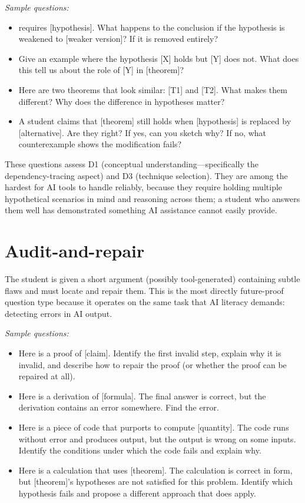 \documentclass[11pt]{book}
\begin{document}
\textit{Sample questions:}

\begin{itemize}\setlength{\itemsep}{2pt}
\item [Theorem] requires [hypothesis]. What happens to the conclusion if the hypothesis is weakened to [weaker version]? If it is removed entirely?
\item Give an example where the hypothesis [X] holds but [Y] does not. What does this tell us about the role of [Y] in [theorem]?
\item Here are two theorems that look similar: [T1] and [T2]. What makes them different? Why does the difference in hypotheses matter?
\item A student claims that [theorem] still holds when [hypothesis] is replaced by [alternative]. Are they right? If yes, can you sketch why? If no, what counterexample shows the modification fails?
\end{itemize}

These questions assess D1 (conceptual understanding---specifically the dependency-tracing aspect) and D3 (technique selection). They are among the hardest for AI tools to handle reliably, because they require holding multiple hypothetical scenarios in mind and reasoning across them; a student who answers them well has demonstrated something AI assistance cannot easily provide.

\section{Audit-and-repair}

The student is given a short argument (possibly tool-generated) containing subtle flaws and must locate and repair them. This is the most directly future-proof question type because it operates on the same task that AI literacy demands: detecting errors in AI output.

\textit{Sample questions:}

\begin{itemize}\setlength{\itemsep}{2pt}
\item Here is a proof of [claim]. Identify the first invalid step, explain why it is invalid, and describe how to repair the proof (or whether the proof can be repaired at all).
\item Here is a derivation of [formula]. The final answer is correct, but the derivation contains an error somewhere. Find the error.
\item Here is a piece of code that purports to compute [quantity]. The code runs without error and produces output, but the output is wrong on some inputs. Identify the conditions under which the code fails and explain why.
\item Here is a calculation that uses [theorem]. The calculation is correct in form, but [theorem]'s hypotheses are not satisfied for this problem. Identify which hypothesis fails and propose a different approach that does apply.
\end{itemize}
\end{document}
